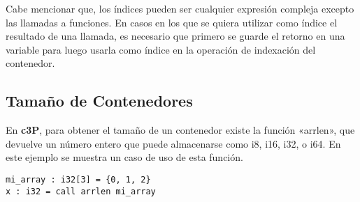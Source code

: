 Cabe mencionar que, los índices pueden ser cualquier expresión compleja excepto las llamadas
a funciones. En casos en los que se quiera utilizar como índice el resultado de una llamada,
es necesario que primero se guarde el retorno en una variable para luego usarla como índice
en la operación de indexación del contenedor.

\subsection{Tamaño de Contenedores}

En \textbf{c3P}, para obtener el tamaño de un contenedor existe la función «arrlen»,
que devuelve un número entero que puede almacenarse como i8, i16, i32, o i64. En
este ejemplo se muestra un caso de uso de esta función.

\begin{verbatim}
mi_array : i32[3] = {0, 1, 2}
x : i32 = call arrlen mi_array
\end{verbatim}
